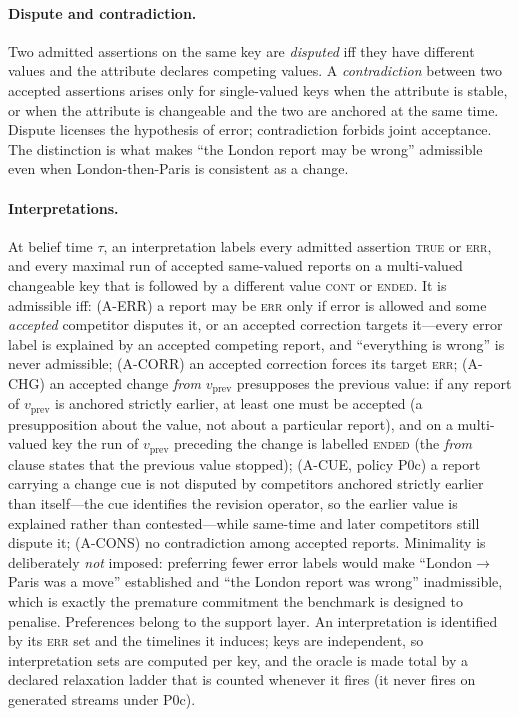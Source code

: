 \paragraph{Dispute and contradiction.} Two admitted assertions on the same key are \emph{disputed} iff they have different values and the attribute declares competing values. A \emph{contradiction} between two accepted assertions arises only for single-valued keys when the attribute is stable, or when the attribute is changeable and the two are anchored at the same time. Dispute licenses the hypothesis of error; contradiction forbids joint acceptance. The distinction is what makes ``the London report may be wrong'' admissible even when London-then-Paris is consistent as a change.

\paragraph{Interpretations.} At belief time $\tau$, an interpretation labels every admitted assertion \textsc{true} or \textsc{err}, and every maximal run of accepted same-valued reports on a multi-valued changeable key that is followed by a different value \textsc{cont} or \textsc{ended}. It is admissible iff:
(A-ERR) a report may be \textsc{err} only if error is allowed and some \emph{accepted} competitor disputes it, or an accepted correction targets it---every error label is explained by an accepted competing report, and ``everything is wrong'' is never admissible;
(A-CORR) an accepted correction forces its target \textsc{err};
(A-CHG) an accepted change \emph{from} $v_{\mathrm{prev}}$ presupposes the previous value: if any report of $v_{\mathrm{prev}}$ is anchored strictly earlier, at least one must be accepted (a presupposition about the value, not about a particular report), and on a multi-valued key the run of $v_{\mathrm{prev}}$ preceding the change is labelled \textsc{ended} (the \emph{from} clause states that the previous value stopped);
(A-CUE, policy P0c) a report carrying a change cue is not disputed by competitors anchored strictly earlier than itself---the cue identifies the revision operator, so the earlier value is explained rather than contested---while same-time and later competitors still dispute it;
(A-CONS) no contradiction among accepted reports.
Minimality is deliberately \emph{not} imposed: preferring fewer error labels would make ``London$\to$Paris was a move'' established and ``the London report was wrong'' inadmissible, which is exactly the premature commitment the benchmark is designed to penalise. Preferences belong to the support layer. An interpretation is identified by its \textsc{err} set and the timelines it induces; keys are independent, so interpretation sets are computed per key, and the oracle is made total by a declared relaxation ladder that is counted whenever it fires (it never fires on generated streams under P0c).

